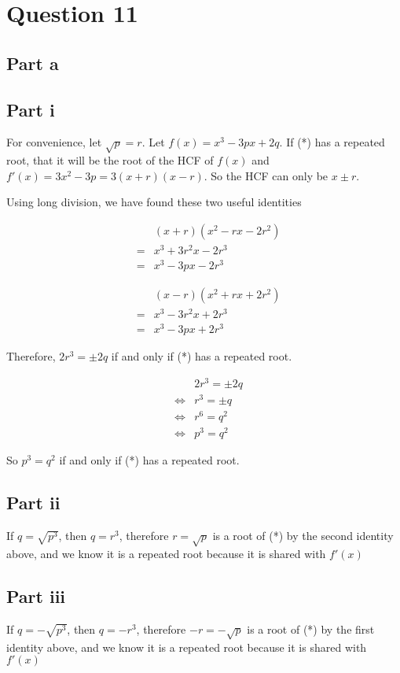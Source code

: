\section*{Question 11}
\subsection*{Part a}
\subsection*{Part i}
For convenience, let $ \sqrt{p} = r $. Let $ f(x) = x^3 - 3px + 2q $. If (*) has a repeated root, that it will be the root of the HCF of $ f(x) $ and $ f'(x) = 3x^2 - 3p = 3(x + r)(x - r) $. So the HCF can only be $ x \pm r $.

Using long division, we have found these two useful identities 

\begin{eqnarray*}
 & & (x+r)(x^2 - rx - 2r^2) \\
 &=& x^3 + 3r^2x - 2r^3 \\
 &=& x^3 - 3px - 2r^3
\end{eqnarray*}

\begin{eqnarray*}
  & & (x-r)(x^2 + rx + 2r^2) \\
  &=& x^3 - 3r^2x + 2r^3 \\
  &=& x^3 - 3px + 2r^3
\end{eqnarray*}

Therefore, $ 2r^3 = \pm 2q $ if and only if (*) has a repeated root.

\begin{eqnarray*}
  &      & 2r^3 = \pm 2q \\
  & \iff & r^3 = \pm q \\
  & \iff & r^6 = q^2 \\
  & \iff & p^3 = q^2
\end{eqnarray*}

So $ p^3 = q^2 $ if and only if (*) has a repeated root.
\subsection*{Part ii}
If $ q = \sqrt{p^3} $, then $ q = r^3 $, therefore $ r = \sqrt{p} $ is a root of (*) by the second identity above, and we know it is a repeated root because it is shared with $ f'(x) $ 

\subsection*{Part iii}
If $ q = -\sqrt{p^3} $, then $ q = -r^3 $, therefore $ -r = -\sqrt{p} $ is a root of (*) by the first identity above, and we know it is a repeated root because it is shared with $ f'(x) $ 
